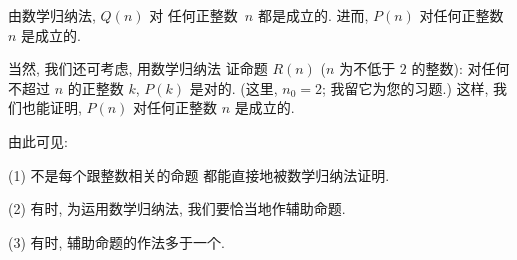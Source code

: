 \documentclass[../libro.tex]{subfiles}
\begin{document}
\begin{example}
    由数学归纳法, \(Q(n)\) 对%
    任何正整数~\(n\) 都是成立的.
    进而, \(P(n)\) 对任何正整数~\(n\) 是成立的.

    当然, 我们还可考虑, 用数学归纳法%
    证命题 \(R(n)\)
    (\(n\) 为不低于 \(2\) 的整数):
    对任何不超过 \(n\) 的正整数 \(k\),
    \(P(k)\) 是对的.
    (这里, \(n_0 = 2\);
    我留它为您的习题.)
    这样, 我们也能证明,
    \(P(n)\) 对任何正整数 \(n\) 是成立的.

    由此可见:

    (1)
    不是每个跟整数相关的命题%
    都能直接地被数学归纳法证明.

    (2)
    有时, 为运用数学归纳法,
    我们要恰当地作辅助命题.

    (3)
    有时, 辅助命题的作法多于一个.
\end{example}
\end{document}
